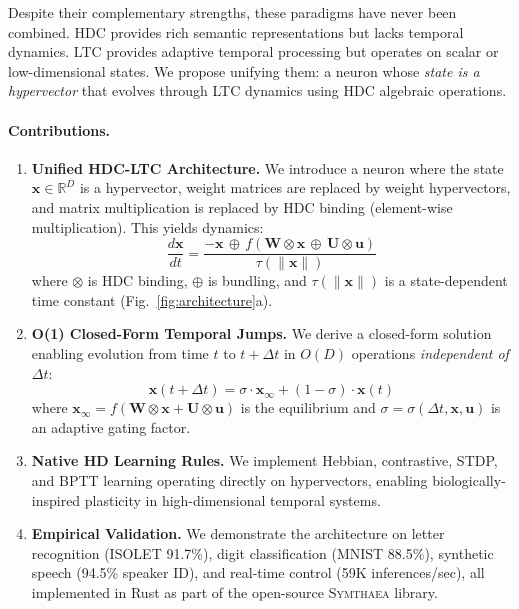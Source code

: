 \documentclass{article}
\newcommand{\bind}{\otimes}
\newcommand{\bundle}{\oplus}
\newcommand{\R}{\mathbb{R}}
\newcommand{\hvx}{\mathbf{x}}
\newcommand{\hvw}{\mathbf{W}}
\newcommand{\hvu}{\mathbf{U}}
\newcommand{\hvinput}{\mathbf{u}}
\newcommand{\xinf}{\mathbf{x}_\infty}
\newcommand{\symthaea}{\textsc{Symthaea}}
\begin{document}
Despite their complementary strengths, these paradigms have never been combined. HDC provides rich semantic representations but lacks temporal dynamics. LTC provides adaptive temporal processing but operates on scalar or low-dimensional states. We propose unifying them: a neuron whose \emph{state is a hypervector} that evolves through LTC dynamics using HDC algebraic operations.

\paragraph{Contributions.}
\begin{enumerate}
    \item \textbf{Unified HDC-LTC Architecture.} We introduce a neuron where the state $\hvx \in \R^D$ is a hypervector, weight matrices are replaced by weight hypervectors, and matrix multiplication is replaced by HDC binding (element-wise multiplication). This yields dynamics:
    \begin{equation}\label{eq:dynamics}
        \frac{d\hvx}{dt} = \frac{-\hvx \,\bundle\, f(\hvw \bind \hvx \,\bundle\, \hvu \bind \hvinput)}{\tau(\|\hvx\|)}
    \end{equation}
    where $\bind$ is HDC binding, $\bundle$ is bundling, and $\tau(\|\hvx\|)$ is a state-dependent time constant (Fig.~\ref{fig:architecture}a).

    \item \textbf{O(1) Closed-Form Temporal Jumps.} We derive a closed-form solution enabling evolution from time $t$ to $t + \Delta t$ in $O(D)$ operations \emph{independent of $\Delta t$}:
    \begin{equation}\label{eq:closedform}
        \hvx(t{+}\Delta t) = \sigma \cdot \xinf + (1 - \sigma) \cdot \hvx(t)
    \end{equation}
    where $\xinf = f(\hvw \bind \hvx + \hvu \bind \hvinput)$ is the equilibrium and $\sigma = \sigma(\Delta t, \hvx, \hvinput)$ is an adaptive gating factor.

    \item \textbf{Native HD Learning Rules.} We implement Hebbian, contrastive, STDP, and BPTT learning operating directly on hypervectors, enabling biologically-inspired plasticity in high-dimensional temporal systems.

    \item \textbf{Empirical Validation.} We demonstrate the architecture on letter recognition (ISOLET 91.7\%), digit classification (MNIST 88.5\%), synthetic speech (94.5\% speaker ID), and real-time control (59K inferences/sec), all implemented in Rust as part of the open-source \symthaea{} library.
\end{enumerate}
\end{document}
